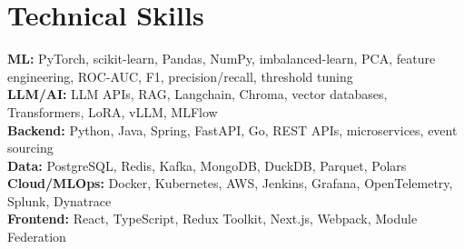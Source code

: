 \documentclass[a4paper,11pt]{article}
\begin{document}
\section{Technical Skills}
\vspace{-7pt}
\begin{itemize}
[leftmargin=0.15in, label={}]\small{\item{
\textbf{ML:} PyTorch, scikit-learn, Pandas, NumPy, imbalanced-learn, PCA, feature engineering, ROC-AUC, F1, precision/recall, threshold tuning \\
\textbf{LLM/AI:} LLM APIs, RAG, Langchain, Chroma, vector databases, Transformers, LoRA, vLLM, MLFlow \\
\textbf{Backend:} Python, Java, Spring, FastAPI, Go, REST APIs, microservices, event sourcing \\
\textbf{Data:} PostgreSQL, Redis, Kafka, MongoDB, DuckDB, Parquet, Polars \\
\textbf{Cloud/MLOps:} Docker, Kubernetes, AWS, Jenkins, Grafana, OpenTelemetry, Splunk, Dynatrace \\
\textbf{Frontend:} React, TypeScript, Redux Toolkit, Next.js, Webpack, Module Federation
}}
\end{itemize}
\end{document}
